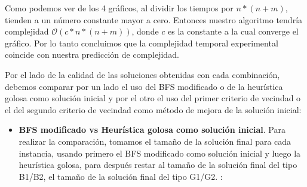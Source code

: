 Como podemos ver de los 4 gráficos, al dividir los tiempos por $n*(n+m)$, tienden a un número constante mayor a cero. Entonces nuestro algoritmo tendría complejidad $\mathcal{O}(c*n*(n+m))$, donde $c$ es la constante a la cual converge el gráfico. Por lo tanto concluimos que la complejidad temporal experimental coincide con nuestra predicción de complejidad.


Por el lado de la calidad de las soluciones obtenidas con cada combinación, debemos comparar por un lado el uso del BFS modificado o de la heurística golosa como solución inicial y por el otro el uso del primer criterio de vecindad o el del segundo criterio de vecindad como método de mejora de la solución inicial:
\begin{itemize}
\item \textbf{BFS modificado vs Heurística golosa como solución inicial}. Para realizar la comparación, tomamos el tamaño de la solución final para cada instancia, usando primero el BFS modificado como solución inicial y luego la heurística golosa, para después restar al tamaño de la solución final del tipo B1/B2, el tamaño de la solución final del tipo G1/G2. :


\end{itemize}
